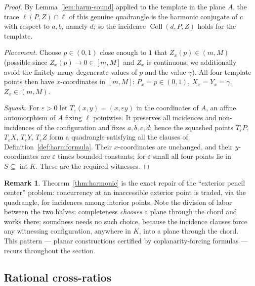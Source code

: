 \documentclass[11pt]{amsart}
\theoremstyle{definition}
\newtheorem{remark}[theorem]{Remark}
\newcommand{\Coll}{\operatorname{Coll}}
\newcommand{\interior}{\operatorname{int}}
\begin{document}
\begin{proof}
By Lemma~\ref{lem:harm-sound} applied to the template in the plane $A$, the
trace $\ell(P,Z)\cap\ell$ of this genuine quadrangle is the harmonic
conjugate of $c$ with respect to $a,b$, namely $d$; so the incidence
$\Coll(d,P,Z)$ holds for the template.

\emph{Placement.} Choose $p\in(0,1)$ close enough to $1$ that
$Z_x(p)\in(m,M)$ (possible since $Z_x(p)\to0\in[m,M]$ and $Z_x$ is
continuous; we additionally avoid the finitely many degenerate values of $p$
and the value $\gamma$). All four template points then have
$x$-coordinates in $[m,M]$: $P_x=p\in(0,1)$, $X_x=Y_x=\gamma$,
$Z_x\in(m,M)$.

\emph{Squash.} For $\varepsilon>0$ let
$T_\varepsilon(x,y)=(x,\varepsilon y)$ in the coordinates of $A$, an affine
automorphism of $A$ fixing $\ell$ pointwise. It preserves all incidences and
non-incidences of the configuration and fixes $a,b,c,d$; hence the squashed
points $T_\varepsilon P$, $T_\varepsilon X$, $T_\varepsilon Y$,
$T_\varepsilon Z$ form a quadrangle satisfying all the clauses of
Definition~\ref{def:harmformula}. Their $x$-coordinates are unchanged, and
their $y$-coordinates are $\varepsilon$ times bounded constants; for
$\varepsilon$ small all four points lie in
$S\subseteq\interior K$. These are the required witnesses.
\end{proof}

\begin{remark}
Theorem~\ref{thm:harmonic} is the exact repair of the ``exterior pencil
center'' problem: concurrency at an inaccessible exterior point is traded,
via the quadrangle, for incidences among interior points. Note the division
of labor between the two halves: completeness \emph{chooses} a plane through
the chord and works there; soundness needs no such choice, because the
incidence clauses force any witnessing configuration, anywhere in $K$, into
a plane through the chord. This pattern --- planar constructions certified by
coplanarity-forcing formulas --- recurs throughout the section.
\end{remark}

\subsection{Rational cross-ratios}\label{subsec:crq}
\end{document}

